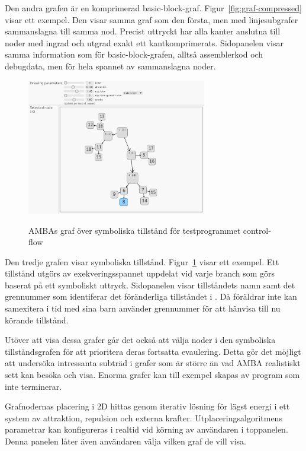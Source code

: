 Den andra grafen är en komprimerad basic-block-graf.
Figur~\ref{fig:graf-compressed} visar ett exempel. Den visar samma graf som den
första, men med linjesubgrafer sammanslagna till samma nod. Precist uttryckt har
alla kanter anslutna till noder med ingrad och utgrad exakt ett
kantkomprimerats. Sidopanelen visar samma information som för basic-block-grafen, alltså assemblerkod och debugdata, men för hela spannet av sammanslagna noder.

\begin{figure}
	\centering
	\includegraphics[width=0.7\textwidth]{figures/graph_symbolic.png}\label{fig:graf-symbolic}
	\caption{AMBAs graf över symboliska tillstånd för testprogrammet control-flow}
\end{figure}

Den tredje grafen visar symboliska tillstånd. Figur~\ref{fig:graf-symbolic}
visar ett exempel. Ett tillstånd utgörs av exekveringsspannet uppdelat vid varje
branch som görs baserat på ett symboliskt uttryck. Sidopanelen visar
tillståndets namn samt det grennummer som identiferar det föränderliga
tillståndet i \stoe{}. Då föräldrar inte kan samexitera i tid med sina barn
använder \stoe{} grennummer för att hänvisa till nu körande tillstånd.

Utöver att visa dessa grafer går det också att välja noder i den symboliska
tillståndsgrafen för att prioritera deras fortsatta evaulering. Detta gör det
möjligt att undersöka intressanta subträd i grafer som är större än vad AMBA
realistiskt sett kan besöka och visa. Enorma grafer kan till exempel skapas av
program som inte terminerar.

Grafnodernas placering i 2D hittas genom iterativ lösning för lägst energi i ett
system av attraktion, repulsion och externa krafter. Utplaceringsalgoritmens
parametrar kan konfigureras i realtid vid körning av användaren i toppanelen.
Denna panelen låter även användaren välja vilken graf de vill visa.


